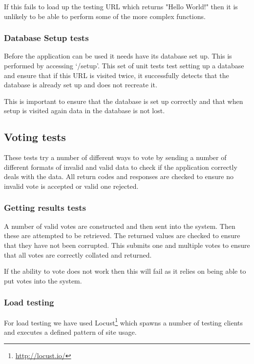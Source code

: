If this fails to load up the testing URL which returns "Hello World!" then it is unlikely to be able to perform some of the more complex functions.

\subsubsection{Database Setup tests}

Before the application can be used it needs have its database set up. This is performed by accessing `/setup'. This set of unit tests test setting up a database and ensure that if this URL is visited twice, it successfully detects that the database is already set up and does not recreate it. 

This is important to ensure that the database is set up correctly and that when setup is visited again data in the database is not lost.

\subsection{Voting tests}

These tests try a number of different ways to vote by sending a number of different formats of invalid and valid data to check if the application correctly deals with the data. All return codes and responses are checked to ensure no invalid vote is accepted or valid one rejected.

\subsubsection{Getting results tests}

A number of valid votes are constructed and then sent into the system. Then these are attempted to be retrieved. The returned values are checked to ensure that they have not been corrupted. This submits one and multiple votes to ensure that all votes are correctly collated and returned.

If the ability to vote does not work then this will fail as it relies on being able to put votes into the system.

\subsubsection{Load testing}

For load testing we have used Locust\footnote{\url{http://locust.io/}} which spawns a number of testing clients and executes a defined pattern of site usage.

